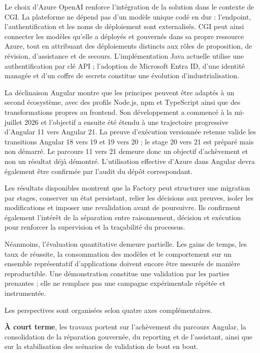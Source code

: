 Le choix d'Azure OpenAI renforce l'intégration de la solution dans le contexte de CGI. La plateforme ne dépend pas d'un modèle unique codé en dur : l'endpoint, l'authentification et les noms de déploiement sont externalisés. CGI peut ainsi connecter les modèles qu'elle a déployés et gouvernés dans sa propre ressource Azure, tout en attribuant des déploiements distincts aux rôles de proposition, de révision, d'assistance et de secours. L'implémentation Java actuelle utilise une authentification par clé API ; l'adoption de Microsoft Entra ID, d'une identité managée et d'un coffre de secrets constitue une évolution d'industrialisation.

La déclinaison Angular montre que les principes peuvent être adaptés à un second écosystème, avec des profils Node.js, npm et TypeScript ainsi que des transformations propres au frontend. Son développement a commencé à la mi-juillet 2026 et l'objectif a ensuite été étendu à une trajectoire progressive d'Angular 11 vers Angular 21. La preuve d'exécution versionnée retenue valide les transitions Angular 18 vers 19 et 19 vers 20 ; le stage 20 vers 21 est préparé mais non démarré. Le parcours 11 vers 21 demeure donc un objectif d'achèvement et non un résultat déjà démontré. L'utilisation effective d'Azure dans Angular devra également être confirmée par l'audit du dépôt correspondant.

Les résultats disponibles montrent que la Factory peut structurer une migration par stages, conserver un état persistant, relier les décisions aux preuves, isoler les modifications et imposer une revalidation avant de poursuivre. Ils confirment également l'intérêt de la séparation entre raisonnement, décision et exécution pour renforcer la supervision et la traçabilité du processus.

Néanmoins, l'évaluation quantitative demeure partielle. Les gains de temps, les taux de réussite, la consommation des modèles et le comportement sur un ensemble représentatif d'applications doivent encore être mesurés de manière reproductible. Une démonstration constitue une validation par les parties prenantes ; elle ne remplace pas une campagne expérimentale répétée et instrumentée.

Les perspectives sont organisées selon quatre axes complémentaires.

\textbf{À court terme}, les travaux portent sur l'achèvement du parcours Angular, la consolidation de la réparation gouvernée, du reporting et de l'assistant, ainsi que sur la stabilisation des scénarios de validation de bout en bout.


